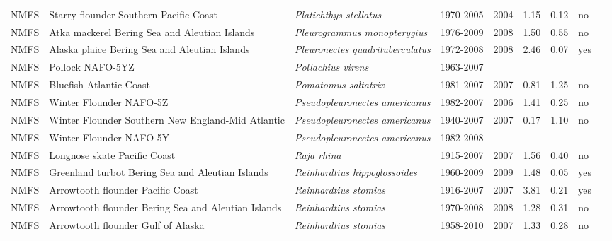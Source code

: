 \begin{longtable}{p{1.8cm}p{4cm}p{4cm}ccccp{1.9cm}c}
  NMFS & Starry flounder Southern Pacific Coast & \textit{Platichthys stellatus} & 1970-2005 & 2004 & 1.15 & 0.12 & no & \cite{2005-SAFE-WCstarryflounder.pdf} \\ 
  NMFS & Atka mackerel Bering Sea and Aleutian Islands & \textit{Pleurogrammus monopterygius} & 1976-2009 & 2008 & 1.50 & 0.55 & no & \cite{2008_SAFE_BSAIatka.pdf} \\ 
  NMFS & Alaska plaice Bering Sea and Aleutian Islands & \textit{Pleuronectes quadrituberculatus} & 1972-2008 & 2008 & 2.46 & 0.07 & yes & \cite{AFSC-ALPLAICBSAI-2008-Alaska plaice BSAI.pdf} \\ 
  NMFS & Pollock NAFO-5YZ & \textit{Pollachius virens} & 1963-2007 &  &  &  &  & \cite{http://www.nefsc.noaa.gov/nefsc/publications/crd/crd0815/crd0815.pdf} \\ 
  NMFS & Bluefish Atlantic Coast & \textit{Pomatomus saltatrix} & 1981-2007 & 2007 & 0.81 & 1.25 & no & \cite{final-2005-SAW-41-assessment.pdf} \\ 
  NMFS & Winter Flounder NAFO-5Z & \textit{Pseudopleuronectes americanus} & 1982-2007 & 2006 & 1.41 & 0.25 & no & \cite{garm3k.pdf} \\ 
  NMFS & Winter Flounder Southern New England-Mid Atlantic & \textit{Pseudopleuronectes americanus} & 1940-2007 & 2007 & 0.17 & 1.10 & no & \cite{NMFS-SNEMATL-Pseudopleuronectesamercianus-2008.pdf} \\ 
  NMFS & Winter Flounder NAFO-5Y & \textit{Pseudopleuronectes americanus} & 1982-2008 &  &  &  &  & \cite{http://www.nefsc.noaa.gov/nefsc/publications/crd/crd0815/crd0815.pdf} \\ 
  NMFS & Longnose skate Pacific Coast & \textit{Raja rhina} & 1915-2007 & 2007 & 1.56 & 0.40 & no & \cite{NWFSC-LNOSESKAPCOAST-2008-Longnose skate.pdf} \\ 
  NMFS & Greenland turbot Bering Sea and Aleutian Islands & \textit{Reinhardtius hippoglossoides} & 1960-2009 & 2009 & 1.48 & 0.05 & yes & \cite{2008_SAFE_BSAIturbot.pdf} \\ 
  NMFS & Arrowtooth flounder Pacific Coast & \textit{Reinhardtius stomias} & 1916-2007 & 2007 & 3.81 & 0.21 & yes & \cite{NWFSC-ARFLOUNDPCOAST-2007-Arrowtooth flounder.pdf} \\ 
  NMFS & Arrowtooth flounder Bering Sea and Aleutian Islands & \textit{Reinhardtius stomias} & 1970-2008 & 2008 & 1.28 & 0.31 & no & \cite{AFSC-ARFLOUNDBSAI-2007-Arrowtooth flounder BSAI.pdf} \\ 
  NMFS & Arrowtooth flounder Gulf of Alaska & \textit{Reinhardtius stomias} & 1958-2010 & 2007 & 1.33 & 0.28 & no & \cite{2008_SAFE_GOAatf.pdf} \\ 

\end{longtable}
